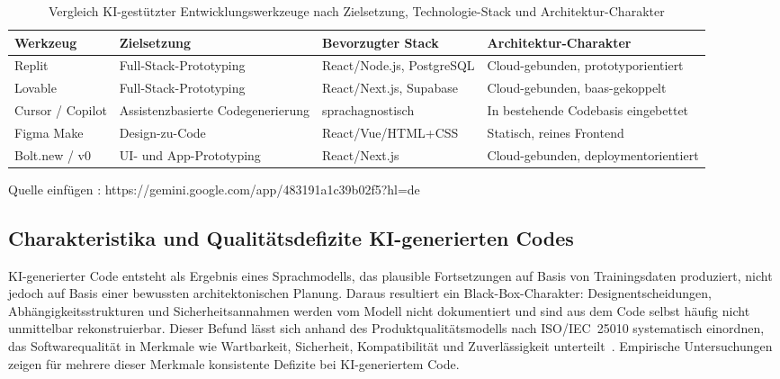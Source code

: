 \begin{table}[ht]
  \centering
  \begin{tabular}{p{2.4cm} p{3.2cm} p{3.6cm} p{4cm}}
    \hline
    \textbf{Werkzeug} & \textbf{Zielsetzung} & \textbf{Bevorzugter Stack} & \textbf{Architektur-Charakter} \\
    \hline
    Replit & Full-Stack-Prototyping & React/Node.js, PostgreSQL & Cloud-gebunden, prototyporientiert \\
    Lovable & Full-Stack-Prototyping & React/Next.js, Supabase & Cloud-gebunden, \gls{baas}-gekoppelt \\
    Cursor / Copilot & Assistenzbasierte Codegenerierung & sprachagnostisch & In bestehende Codebasis eingebettet \\
    Figma Make & Design-zu-Code & React/Vue/HTML+CSS & Statisch, reines Frontend \\
    Bolt.new / v0 & UI- und App-Prototyping & React/Next.js & Cloud-gebunden, deploymentorientiert \\
    \hline
  \end{tabular}
  \caption{Vergleich KI-gestützter Entwicklungswerkzeuge nach Zielsetzung, Technologie-Stack und Architektur-Charakter}
  \label{tab:ki-tools-vergleich}
\end{table}
Quelle einfügen : https://gemini.google.com/app/483191a1c39b02f5?hl=de
\subsection{Charakteristika und Qualitätsdefizite KI-generierten Codes}
\label{sec:charakteristika-ki-code}
KI-generierter Code entsteht als Ergebnis eines Sprachmodells, das plausible Fortsetzungen auf Basis von Trainingsdaten produziert, nicht jedoch auf Basis einer bewussten architektonischen Planung.
Daraus resultiert ein Black-Box-Charakter: Designentscheidungen, Abhängigkeitsstrukturen und Sicherheitsannahmen werden vom Modell nicht dokumentiert und sind aus dem Code selbst häufig nicht unmittelbar rekonstruierbar.
Dieser Befund lässt sich anhand des Produktqualitätsmodells nach ISO/IEC~25010 systematisch einordnen, das Softwarequalität in Merkmale wie Wartbarkeit, Sicherheit, Kompatibilität und Zuverlässigkeit unterteilt~\cite{iso25010}.
Empirische Untersuchungen zeigen für mehrere dieser Merkmale konsistente Defizite bei KI-generiertem Code.

